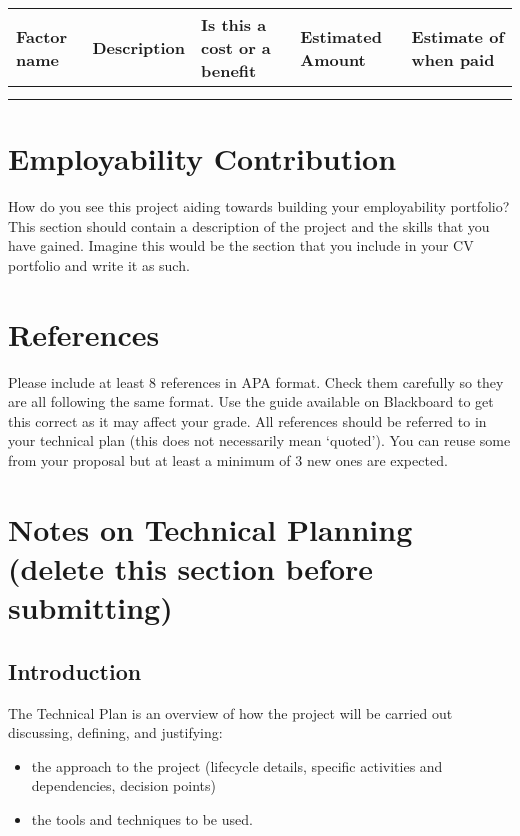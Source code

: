 \documentclass[a4paper,11pt]{techplan}
\begin{document}
\begin{center}
    \begin{tabularx}{\textwidth}{|X|X|X|X|X|}
    
    \hline
    \textbf{Factor name} & \textbf{Description} & \textbf{Is this a cost or a benefit} & \textbf{Estimated Amount} & \textbf{Estimate of when paid} \\
    \hline
    & & & & \\
    \hline
    & & & & \\
    \hline
    \end{tabularx}
\end{center}

\section*{Employability Contribution}

How do you see this project aiding towards building your employability portfolio? This section should contain a description of the project and the skills that you have gained. Imagine this would be the section that you include in your CV portfolio and write it as such.

\section*{References}

Please include at least 8 references in APA format. Check them carefully so they are all following the same format. Use the guide available on Blackboard to get this correct as it may affect your grade. All references should be referred to in your technical plan (this does not necessarily mean ‘quoted’). You can reuse some from your proposal but at least a minimum of 3 new ones are expected. 

\pagebreak

\section*{Notes on Technical Planning (delete this section before submitting)}

\subsection*{Introduction}
The Technical Plan is an overview of how the project will be carried out discussing, defining, and justifying:

\begin{itemize}
    \item the approach to the project (lifecycle details, specific activities and dependencies, decision points)
    \item the tools and techniques to be used.
\end{itemize}
\end{document}
